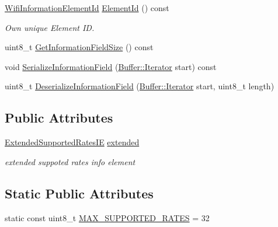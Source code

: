 \begin{DoxyCompactItemize}
\item 
\hyperlink{namespacens3_aeb185e0c8a60816016bca079f1420478}{Wifi\+Information\+Element\+Id} \hyperlink{classns3_1_1SupportedRates_affeaddf3d2d9c2618fd1af4f50d7e4d9}{Element\+Id} () const 
\begin{DoxyCompactList}\small\item\em Own unique Element ID. \end{DoxyCompactList}\item 
uint8\+\_\+t \hyperlink{classns3_1_1SupportedRates_a862e78586f2ec28427da15ab54606374}{Get\+Information\+Field\+Size} () const 
\item 
void \hyperlink{classns3_1_1SupportedRates_a40aa2349e55ae039a5d8f2293057a57d}{Serialize\+Information\+Field} (\hyperlink{classns3_1_1Buffer_1_1Iterator}{Buffer\+::\+Iterator} start) const 
\item 
uint8\+\_\+t \hyperlink{classns3_1_1SupportedRates_a2212a6b6f233ff11fb2e57bd34c61662}{Deserialize\+Information\+Field} (\hyperlink{classns3_1_1Buffer_1_1Iterator}{Buffer\+::\+Iterator} start, uint8\+\_\+t length)
\end{DoxyCompactItemize}
\subsection*{Public Attributes}
\begin{DoxyCompactItemize}
\item 
\hyperlink{classns3_1_1ExtendedSupportedRatesIE}{Extended\+Supported\+Rates\+IE} \hyperlink{classns3_1_1SupportedRates_a313f3392cbf8248cf2822d53f3914aaf}{extended}
\begin{DoxyCompactList}\small\item\em extended suppoted rates info element \end{DoxyCompactList}\end{DoxyCompactItemize}
\subsection*{Static Public Attributes}
\begin{DoxyCompactItemize}
\item 
static const uint8\+\_\+t \hyperlink{classns3_1_1SupportedRates_ac9bc5778c688e7b70f17dc4536de3922}{M\+A\+X\+\_\+\+S\+U\+P\+P\+O\+R\+T\+E\+D\+\_\+\+R\+A\+T\+ES} = 32
\end{DoxyCompactItemize}
